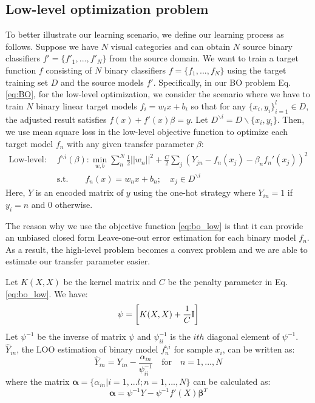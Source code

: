 \subsection{Low-level optimization problem}
To better illustrate our learning scenario, we define our learning process as follows. Suppose we have $N$ visual categories and 
can obtain $N$ source binary classifiers $f'=\{f'_1,...,f'_N\}$ from the source domain. We want to train a target function $f$ consisting of $N$ binary classifiers $f=\{f_1,...,f_N\}$ using the target training set $D$ and the source models $f'$.
Specifically, in our BO problem Eq. \eqref{eq:BO}, for the low-level optimization, we consider the scenario where we have to train $N$ binary linear target models $f_i = w_ix+b_i$ so that for any $\{x_i,y_i\}_{i=1}^l \in D$, the adjusted result satisfies $f(x)+f'(x)\beta = y$. Let $D^{\backslash i} = D\backslash\{x_i,y_i\}$.
Then, we use mean square loss in the low-level objective function to optimize each target model $f_n$ with any given transfer parameter $\beta$:
\begin{equation}\label{eq:bo_low}
\begin{aligned}
\text{Low-level:}\quad&f^{\backslash i}(\beta) : \underset{w,b}{\min} \sum_n^N\frac{1}{2}||w_n||^2+\frac{C}{2}\sum_j\left(Y_{jn}-f_n(x_j)-\beta_n f_n'(x_j)\right)^2\\
&\text{s.t.} \qquad f_n(x) = w_nx+b_n; \quad x_j \in D^{\backslash i}
\end{aligned}
\end{equation}
Here, $Y$ is an encoded matrix of $y$ using the one-hot strategy where $Y_{in} =1$ if $y_i=n$ and 0 otherwise.

The reason why we use the objective function \eqref{eq:bo_low} is that it can provide an unbiased closed form Leave-one-out error estimation for each binary model $f_n$\cite{cawley2006leave}. As a result, the high-level problem becomes a convex problem and we are able to estimate our transfer parameter easier.

Let $K(X,X)$ be the kernel matrix and $C$ be the penalty parameter in Eq.\eqref{eq:bo_low}. We have:
\begin{equation}\label{eq:linear}
\psi=\left[ 
{K(X,X) + \frac{1}{C}{\rm{I}}} \right]
\end{equation}
Let $\psi^{-1}$ be the inverse of matrix $\psi$ and  $\psi_{ii}^{-1}$ is the $ith$ diagonal element of $\psi^{-1}$. $\hat{Y}_{in}$, the LOO estimation of binary model $f^{\backslash i}_n$ for sample $x_i$, can be written as\cite{cawley2006leave}:
\begin{equation} \label{eq:loo}
{\hat Y_{in}} = {Y_{in}} - \frac{{{\alpha _{in}}}}{{\psi_{ii}^{ - 1}}}\quad {\text{for}}\quad n = 1,...,N
\end{equation}
where the matrix $\boldsymbol{\alpha}=\{\alpha_{in}|i=1,...l;n=1,...,N\}$ can be calculated as:
\begin{equation}
\boldsymbol{\alpha} =\psi^{-1} Y - \psi^{-1} f'(X)\boldsymbol{\beta}^T
\end{equation}

